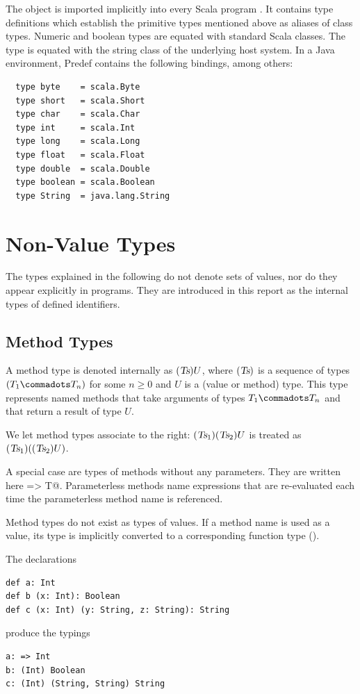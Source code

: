 The object \lstinline@Predef@ is imported implicitly into every Scala
program . It contains type definitions which establish the primitive
types mentioned above as aliases of class types. Numeric and boolean
types are equated with standard Scala classes. The \lstinline@String@
type is equated with the string class of the underlying host
system. In a Java environment, Predef contains the following bindings,
among others:
\begin{lstlisting}
  type byte    = scala.Byte
  type short   = scala.Short
  type char    = scala.Char
  type int     = scala.Int
  type long    = scala.Long
  type float   = scala.Float
  type double  = scala.Double
  type boolean = scala.Boolean
  type String  = java.lang.String
\end{lstlisting}


\section{Non-Value Types}
\label{sec:synthetic-types}

The types explained in the following do not denote sets of values, nor
do they appear explicitly in programs. They are introduced in this
report as the internal types of defined identifiers.

\subsection{Method Types}
\label{sec:method-types}

A method type is denoted internally as $(\mbox{\sl Ts})U$, where $(\mbox{\sl Ts})$ is a
sequence of types $(T_1 \commadots T_n)$ for some $n \geq 0$
and $U$ is a (value or method) type.  This type represents named
methods that take arguments of types $T_1 \commadots T_n$ 
and that return a result of type $U$.

We let method types associate to the right: $(\mbox{\sl Ts}_1)(\mbox{\sl Ts}_2)U$ is
treated as $(\mbox{\sl Ts}_1)((\mbox{\sl Ts}_2)U)$.

A special case are types of methods without any parameters. They are
written here \lstinline@=> T@. Parameterless methods name expressions
that are re-evaluated each time the parameterless method name is
referenced.

Method types do not exist as types of values. If a method name is used
as a value, its type is implicitly converted to a corresponding
function type ().

\example The declarations
\begin{lstlisting}
def a: Int
def b (x: Int): Boolean
def c (x: Int) (y: String, z: String): String
\end{lstlisting}
produce the typings
\begin{lstlisting}
a: => Int
b: (Int) Boolean
c: (Int) (String, String) String
\end{lstlisting}

